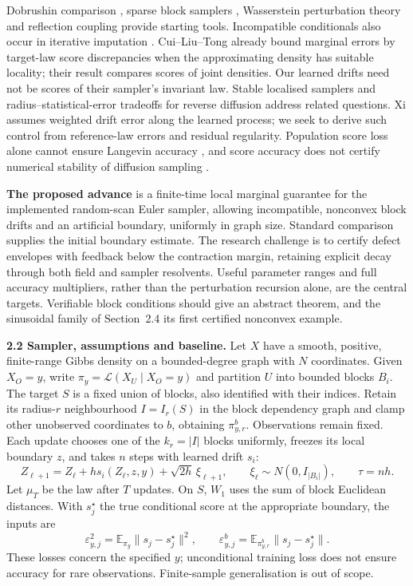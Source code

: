 \documentclass[12pt,a4paper]{article}
\newcommand{\E}{\mathbb E}
\newcommand{\W}{W_1}
\newcommand{\piy}{\pi_y}
\newcommand{\pir}{\pi_{y,r}^{b}}
\begin{document}
Dobrushin comparison \cite{Dob70,RvH14}, sparse block samplers \cite{TMM20}, Wasserstein perturbation theory \cite{RS18} and reflection coupling \cite{Eberle16,MMS20} provide starting tools. Incompatible conditionals also occur in iterative imputation \cite{LGHSK14}. Cui--Liu--Tong \cite{CLT} already bound marginal errors by target-law score discrepancies when the approximating density has suitable locality; their result compares scores of joint densities. Our learned drifts need not be scores of their sampler's invariant law. Stable localised samplers \cite{GR26} and radius--statistical-error tradeoffs for reverse diffusion \cite{GLMRT} address related questions. Xi \cite{Xi26} assumes weighted drift error along the learned process; we seek to derive such control from reference-law errors and residual regularity. Population score loss alone cannot ensure Langevin accuracy \cite{CCSW26}, and score accuracy does not certify numerical stability of diffusion sampling \cite{Zho26}.

\textbf{The proposed advance} is a finite-time local marginal guarantee for the implemented random-scan Euler sampler, allowing incompatible, nonconvex block drifts and an artificial boundary, uniformly in graph size. Standard comparison supplies the initial boundary estimate. The research challenge is to certify defect envelopes with feedback below the contraction margin, retaining explicit decay through both field and sampler resolvents. Useful parameter ranges and full accuracy multipliers, rather than the perturbation recursion alone, are the central targets. Verifiable block conditions should give an abstract theorem, and the sinusoidal family of Section~2.4 its first certified nonconvex example.

\textbf{2.2 Sampler, assumptions and baseline.}
Let $X$ have a smooth, positive, finite-range Gibbs density on a bounded-degree graph with $N$ coordinates. Given $X_O=y$, write $\piy=\mathcal L(X_U\mid X_O=y)$ and partition $U$ into bounded blocks $B_i$. The target $S$ is a fixed union of blocks, also identified with their indices. Retain its radius-$r$ neighbourhood $I=I_r(S)$ in the block dependency graph and clamp other unobserved coordinates to $b$, obtaining $\pir$. Observations remain fixed. Each update chooses one of the $k_r=|I|$ blocks uniformly, freezes its local boundary $z$, and takes $n$ steps with learned drift $s_i$:
\begin{equation}\label{eq:update}
 Z_{\ell+1}=Z_\ell+h s_i(Z_\ell,z,y)+\sqrt{2h}\,\xi_{\ell+1},
 \qquad \xi_\ell\sim N(0,I_{|B_i|}),\qquad \tau=nh.
\end{equation}
Let $\mu_T$ be the law after $T$ updates. On $S$, $\W$ uses the sum of block Euclidean distances. With $s_j^\star$ the true conditional score at the appropriate boundary, the inputs are
\[
 \varepsilon_{y,j}^2=\E_{\piy}\|s_j-s_j^\star\|^2,
 \qquad \varepsilon^b_{y,j}=\E_{\pir}\|s_j-s_j^\star\|.
\]
These losses concern the specified $y$; unconditional training loss does not ensure accuracy for rare observations. Finite-sample generalisation is out of scope.
\end{document}
